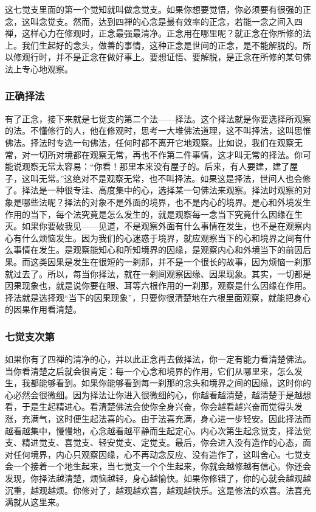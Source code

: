 \documentclass{book}
\begin{document}
这七觉支里面的第一个觉知就叫做念觉支。如果你想要觉悟，你必须要有很强的正念，这叫念觉支。然而，达到四禅的心念是最有效率的正念，若能一念之间入四禅，这样心力在修观时，正念最强最清净。正念用在哪里呢？就正念在你所修的法上。我们生起好的念头，做善的事情，这种正念是世间的正念，是不能解脱的。所以修观行时，并不是正念在做好事上。要想证悟、要解脱，是正念在所修的某句佛法上专心地观察。

\subsubsection{正确择法}

有了正念，接下来就是七觉支的第二个法——择法。这个择法就是你要选择所观察的法。不懂修行的人，他在修观时，思考一大堆佛法道理，这不叫择法，这叫思惟佛法。择法时专选一句佛法，任何时都不离开它地观察。比如说，我们在观察无常，对一切所对境都在观察无常，再也不作第二件事情，这才叫无常的择法。你可能说观察无常太容易：``你看！那里本来没有屋子的。后来，有人要建，建了屋子，这叫无常。''这绝对不是观察无常，也不叫择法。如果这是择法，世间人也会修了。择法是一种很专注、高度集中的心，选择某一句佛法来观察。择法时观察的对象是哪些法呢？择法的对象不是外面的境界，也不是内心的境界。是心和外境发生作用的当下，每个法究竟是怎么发生的，就是观察每一念当下究竟什么因缘在生灭。如果你要破我见——见道，不是观察外面有什么事情在发生，也不是在观察内心有什么烦恼发生。因为我们的心迷惑于境界，就应观察当下的心和境界之间有什么事情在发生。是观察能知心和所知境界的因缘，是观察内心和外境当下的前因后果。而这类因果是发生在很短的一刹那，并不是一个很长的故事，因为烦恼一刹那就过去了。所以，每当你择法，就在一刹间观察因缘、因果现象。其实，一切都是因果现象也，就是说你要在眼、耳等六根作用的一刹那，观察是什么因缘在作用。择法就是选择观``当下的因果现象''，只要你很清楚地在六根里面观察，就能把身心的因果作用看清楚。

\subsubsection{七觉支次第}

如果你有了四禅的清净的心，并以此正念再去做择法，你一定有能力看清楚佛法。当你看清楚之后就会很肯定：每一个心念和境界的作用，它们从哪里来，怎么发生，我都能够看到。如果你能够看到每一刹那的念头和境界之间的因缘，这时你的心必然会很微细。因为择法让你进入很微细的心，你越看越清楚，越清楚于是越想看，于是生起精进心。看清楚佛法会使你全身兴奋，你会越看越兴奋而觉得头发涨，充满气，这时便生起法喜的心。由于法喜充满，身心进一步轻安。因此择法而越看越集中，慢慢地，心念越看越平静而生起定心。内心次第生起念觉支，择法觉支、精进觉支、喜觉支、轻安觉支、定觉支。最后，你会进入没有造作的心态，面对任何境界，内心只观察因缘，心不再动念反应、没有造作了，这叫舍心。七觉支会一个接着一个地生起来，当七觉支一个个生起来，你就会越修越有信心。你还会发现，你择法越清楚，烦恼越轻，身心越愉快。如果你修错了，你的心就会越观越沉重，越观越烦。你修对了，越观越欢喜，越观越快乐。这是修法的欢喜。法喜充满就从这里来。
\end{document}
